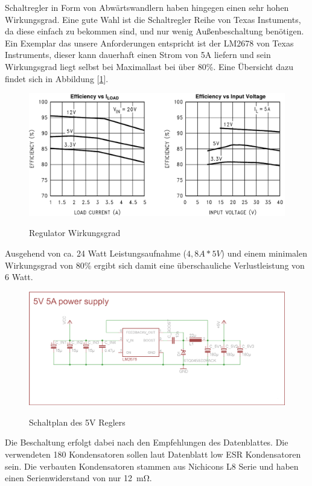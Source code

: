 Schaltregler in Form von Abwärtswandlern haben hingegen einen sehr hohen Wirkungsgrad. Eine gute Wahl ist die Schaltregler Reihe von Texas Instuments, da diese einfach zu bekommen sind,
und nur wenig Außenbeschaltung benötigen. Ein Exemplar das unsere Anforderungen entspricht ist der LM2678 von Texas Instruments, dieser kann dauerhaft einen Strom von 5A liefern und sein Wirkungsgrad
liegt selbst bei Maximallast bei über 80\%.
Eine Übersicht dazu findet sich in Abbildung [\ref{fig:vreg-eff}].
\begin{figure}[H]
\centering
\includegraphics[width=.8\textwidth]{vreg.png}\\
\caption{Regulator Wirkungsgrad \cite{ds-ti}}%
\label{fig:vreg-eff}
\end{figure}
Ausgehend von ca. 24 Watt Leistungsaufnahme ($4,8A*5V$) und einem minimalen Wirkungsgrad von 80\%  ergibt sich damit eine überschauliche Verlustleistung von 6 Watt.


\begin{figure}[H]
\centering
\includegraphics[width=.8\textwidth]{5vregler.png}\\
\caption{Schaltplan des 5V Reglers}%
\label{fig:vreg}
\end{figure}


Die Beschaltung erfolgt dabei nach den Empfehlungen des Datenblattes. Die verwendeten \SI{180}{\uF} Kondensatoren sollen laut Datenblatt low ESR Kondensatoren sein. 
Die verbauten Kondensatoren stammen aus Nichicons L8 Serie und haben einen Serienwiderstand von nur \SI{12}{\mohm}.


